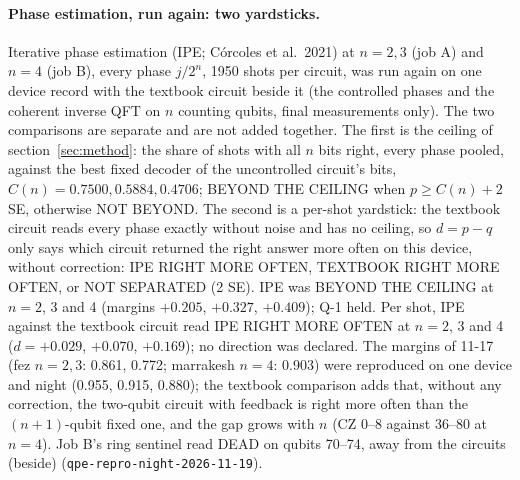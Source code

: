 \documentclass[10pt,a4paper]{article}
\begin{document}
\paragraph{Phase estimation, run again: two yardsticks.} Iterative phase estimation (IPE; C\'orcoles et al.\ 2021) at
$n = 2, 3$ (job A) and $n = 4$ (job B), every phase $j/2^n$, 1950 shots per circuit, was run again on one device record
with the textbook circuit beside it (the controlled phases and the coherent inverse QFT on $n$ counting qubits, final
measurements only). The two comparisons are separate and are not added together. The first is the ceiling of
section~\ref{sec:method}: the share of shots with all $n$ bits right, every phase pooled, against the best fixed decoder
of the uncontrolled circuit's bits, $C(n) = 0.7500, 0.5884, 0.4706$; BEYOND THE CEILING when $p \ge C(n) + 2$ SE,
otherwise NOT BEYOND. The second is a per-shot yardstick: the textbook circuit reads every phase exactly without noise
and has no ceiling, so $d = p - q$ only says which circuit returned the right answer more often on this device, without
correction: IPE RIGHT MORE OFTEN, TEXTBOOK RIGHT MORE OFTEN, or NOT SEPARATED (2 SE). IPE was BEYOND THE CEILING
at $n = 2$, 3 and 4 (margins $+0.205$, $+0.327$, $+0.409$); Q-1 held. Per shot, IPE against the textbook circuit read
IPE RIGHT MORE OFTEN at $n = 2$, 3 and 4 ($d = +0.029$, $+0.070$, $+0.169$); no direction was declared. The margins of
11-17 (fez $n = 2, 3$: 0.861, 0.772; marrakesh $n = 4$: 0.903) were reproduced on one device and night (0.955, 0.915,
0.880); the textbook comparison adds that, without any correction, the two-qubit circuit with feedback is right more
often than the $(n+1)$-qubit fixed one, and the gap grows with $n$ (CZ 0--8 against 36--80 at $n = 4$). Job B's ring
sentinel read DEAD on qubits 70--74, away from the circuits (beside)
(\texttt{qpe-repro-night-2026-11-19}).
\end{document}
